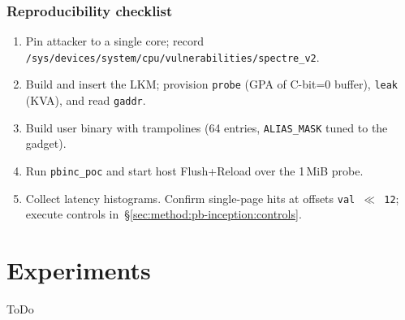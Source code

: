 \documentclass[11pt,a4paper]{article}
\begin{document}
\subsubsection{Reproducibility checklist}
\label{sec:method:pb-inception:repro}
\begin{enumerate}
  \item Pin attacker to a single core; record \texttt{/sys/devices/system/cpu/vulnerabilities/spectre\_v2}.
  \item Build and insert the LKM; provision \texttt{probe} (GPA of C-bit=0 buffer), \texttt{leak} (KVA), and read \texttt{gaddr}.
  \item Build user binary with trampolines (64 entries, \texttt{ALIAS\_MASK} tuned to the gadget).
  \item Run \texttt{pbinc\_poc} and start host Flush+Reload over the 1\,MiB probe.
  \item Collect latency histograms. Confirm single-page hits at offsets \texttt{val\,$\ll$\,12}; execute controls in~\S\ref{sec:method:pb-inception:controls}.
\end{enumerate}

\section{Experiments}
ToDo
\end{document}
